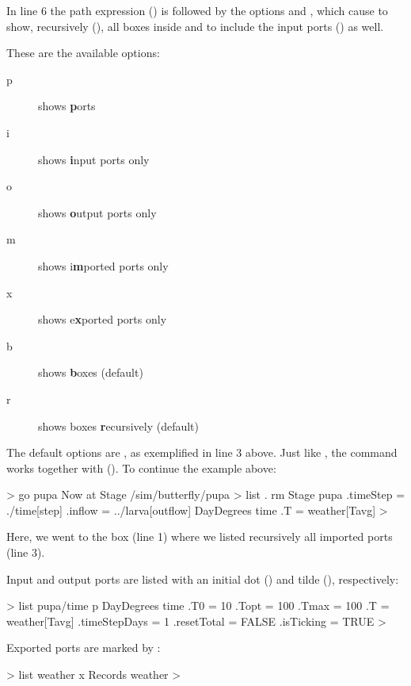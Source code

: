 In line 6 the path expression () is followed by the options  and , which cause  to show, recursively (), all boxes inside  and to include the input ports () as well. 

These are the available options:
\begin{description}
\item[p] shows \textbf{p}orts
\item[i] shows \textbf{i}nput ports only
\item[o] shows \textbf{o}utput ports only
\item[m] shows i\textbf{m}ported ports only
\item[x] shows e\textbf{x}ported ports only
\item[b] shows \textbf{b}oxes (default)
\item[r] shows boxes \textbf{r}ecursively (default)
\end{description}

The default options are , as exemplified in line 3 above. Just like , the  command works together with  (). To continue the example above:

\lstset{numbers=left}
\begin{usdialog}
> go pupa
Now at Stage /sim/butterfly/pupa
> list . rm
Stage pupa
  .timeStep = ./time[step]
  .inflow = ../larva[outflow]
  DayDegrees time
    .T = weather[Tavg]
>
\end{usdialog}
\lstset{numbers=none}

Here, we went to the  box (line 1) where we listed recursively all imported ports (line 3). 

Input and output ports are listed with an initial dot () and tilde (\code{\mytilde}), respectively:

\lstset{numbers=left}
\begin{usdialog}
> list pupa/time p
DayDegrees time
  .T0 = 10
  .Topt = 100
  .Tmax = 100
  .T = weather[Tavg]
  .timeStepDays = 1
  .resetTotal = FALSE
  .isTicking = TRUE
>
\end{usdialog}
\lstset{numbers=none}

Exported ports are marked by \code{>{}>}:

\lstset{numbers=left}
\begin{usdialog}
> list weather x
Records weather
>
\end{usdialog}
\lstset{numbers=none}

